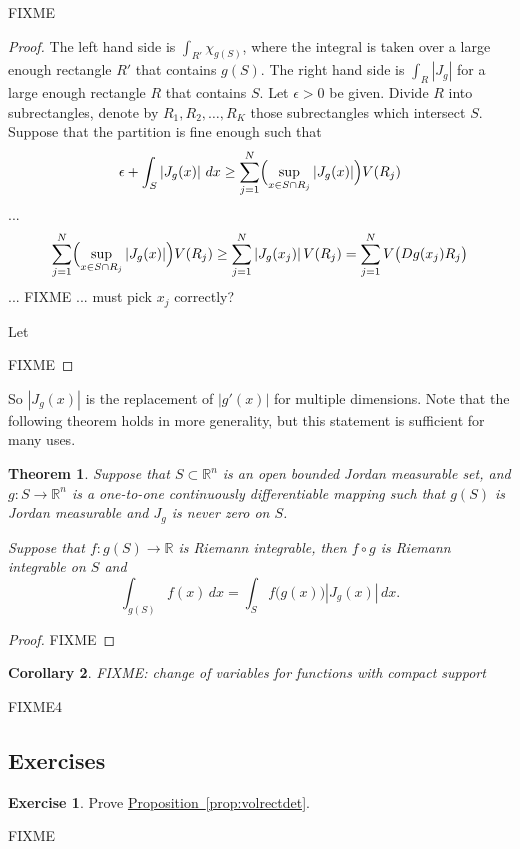 \documentclass[12pt]{book}
\newcommand{\abs}[1]{\left\lvert {#1} \right\rvert}
\newcommand{\R}{{\mathbb{R}}}
\theoremstyle{plain}
\newtheorem{thm}{Theorem}[section]
\newtheorem{lemma}[thm]{Lemma}
\newtheorem{cor}[thm]{Corollary}
\theoremstyle{remark}
\theoremstyle{definition}
\theoremstyle{exercise}
\newtheorem{exercise}{Exercise}[section]
\theoremstyle{example}
\newcommand{\propref}[1]{\hyperref[#1]{Proposition~\ref*{#1}}}
\begin{document}

FIXME

\begin{proof}
The left hand side is $\int_{R'} \chi_{g(S)}$, where the integral is taken over a
large enough rectangle $R'$ that contains $g(S)$.
The right hand side is $\int_{R} \abs{J_g}$ for
a large enough rectangle $R$ that contains $S$.  Let $\epsilon > 0$ be
given.  Divide $R$ into
subrectangles, denote
by $R_1,R_2,\ldots,R_K$ those subrectangles which intersect $S$.
Suppose that the partition is fine enough such that
\begin{equation*}
\epsilon + \int_S \abs{J_g(x)} \, dx \geq
\sum_{j=1}^N \Bigl(\sup_{x \in S \cap R_j} \abs{J_g(x)} \Bigr) V(R_j)
\end{equation*}
...
\begin{equation*}
\sum_{j=1}^N \Bigl(\sup_{x \in S \cap R_j} \abs{J_g(x)} \Bigr) V(R_j)
\geq
\sum_{j=1}^N \abs{J_g(x_j)}  V(R_j)
=
\sum_{j=1}^N V\bigl(Dg(x_j) R_j\bigr)
\end{equation*}
... FIXME ... must pick $x_j$ correctly?




Let 






FIXME
\end{proof}

So $\abs{J_g(x)}$ is the replacement of $\abs{g'(x)}$ for multiple
dimensions.  Note that the following theorem holds in more generality,
but this statement is sufficient for many uses.

\begin{thm}
Suppose that $S \subset \R^n$ is an open bounded Jordan measurable set, and
$g \colon S \to \R^n$ is a one-to-one
continuously differentiable mapping such that
$g(S)$ is Jordan measurable and $J_g$ is never zero on $S$.

Suppose that $f \colon g(S) \to \R$ is Riemann
integrable, then $f \circ g$ is Riemann integrable on $S$ and
\begin{equation*}
\int_{g(S)} f(x) \, dx = 
\int_S f\bigl(g(x)\bigr) \abs{J_g(x)} \, dx .
\end{equation*}
\end{thm}

\begin{proof}
FIXME
\end{proof}

\begin{cor}
FIXME: change of variables for functions with compact support
\end{cor}

FIXME4

\subsection{Exercises}

\begin{exercise}
Prove \propref{prop:volrectdet}.
\end{exercise}

FIXME
\end{document}
